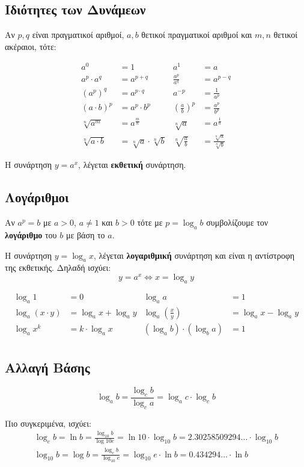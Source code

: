 \subsection{Ιδιότητες των Δυνάμεων}

Αν $p,q$ είναι πραγματικοί αριθμοί, $a,b$ θετικοί πραγματικοί αριθμοί και $m,n$ θετικοί ακέραιοι, τότε:

\begin{align*}
  a^{0}&=1 & a^{1}&=a \\
  a^{p}\cdot a^{q}&=a^{p+q} & \frac{a^{p}}{a^{q}}&=a^{p-q}\\
  (a^{p})^{q}&=a^{p\cdot q} &  a^{-p}&=\frac{1}{a^{p}} \\
  (a\cdot b)^{p}&=a^{p}\cdot b^{p} & \left(\frac{a}{b}\right)^{p}&=\frac{a^{p}}{b^{p}} \\
  \sqrt[n]{a^{m}}&=a^{\frac{m}{n}} & \sqrt[n]{a}&=a^{\frac{1}{n}} \\
  \sqrt[n]{a\cdot b}&=\sqrt[n]{a}\cdot \sqrt[n]{b} & \sqrt[n]{\frac{a}{b}}&=\frac{\sqrt[n]{a}}{\sqrt[n]{b}}
\end{align*}

H συνάρτηση $y=a^{x}$, λέγεται \textbf{\color{blue} εκθετική} συνάρτηση.

\subsection{Λογάριθμοι}

Αν $a^{p}=b$ με $a>0$, $a\neq 1$ και $b>0$ τότε με $p=\log_{a}b$ συμβολίζουμε τον \textbf{λογάριθμο} του $b$ με βάση το $a$.

Η συνάρτηση $y=\log_{a}x$, λέγεται \textbf{\color{blue} λογαριθμική} συνάρτηση και είναι η αντίστροφη της εκθετικής. Δηλαδή ισχύει:
\[
y=a^{x}\Leftrightarrow x=\log_{a}y
\]

\begin{align*}
  \log_{a}1&=0 & \log_{a}a&=1 \\
  \log_{a}(x\cdot y)&=\log_{a}x+\log_{a}y & \log_{a}\left(\frac{x}{y}\right)&=\log_{a}x-\log_{a}y \\
  \log_{a}x^{k}&=k\cdot \log_{a}x & (\log_{a}b)\cdot (\log_{b}a)&=1 \\
\end{align*}

\subsection{Αλλαγή Βάσης}

\[
\log_{a}b=\frac{\log_{c}b}{\log_{c}a}=\log_{a}c\cdot \log_{c}b
\]

Πιο συγκεριμένα, ισχύει:
\begin{gather*}
  \log_{e}b=\ln b = \frac{\log_{10}b}{\log{10}e}=\ln 10\cdot \log_{10}b = {2.30258509294\ldots}\cdot \log_{10}b \\
  \log_{10}b=\log b = \frac{\log_{e}b}{\log_{10}e}=\log_{10}e\cdot \ln b = {0.434294\ldots}\cdot \ln b
\end{gather*}
